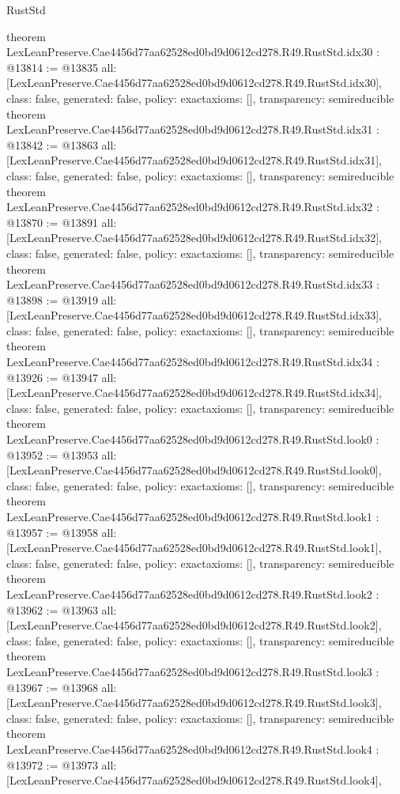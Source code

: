 \begin{lexlean}{RustStd}
\begin{coremodule}
{}
theorem LexLeanPreserve.Cae4456d77aa62528ed0bd9d0612cd278.R49.RustStd.idx30 : @13814 := @13835 {
  all: [LexLeanPreserve.Cae4456d77aa62528ed0bd9d0612cd278.R49.RustStd.idx30],
  class: false,
  generated: false,
  policy: exact{axioms: []},
  transparency: semireducible
}
theorem LexLeanPreserve.Cae4456d77aa62528ed0bd9d0612cd278.R49.RustStd.idx31 : @13842 := @13863 {
  all: [LexLeanPreserve.Cae4456d77aa62528ed0bd9d0612cd278.R49.RustStd.idx31],
  class: false,
  generated: false,
  policy: exact{axioms: []},
  transparency: semireducible
}
theorem LexLeanPreserve.Cae4456d77aa62528ed0bd9d0612cd278.R49.RustStd.idx32 : @13870 := @13891 {
  all: [LexLeanPreserve.Cae4456d77aa62528ed0bd9d0612cd278.R49.RustStd.idx32],
  class: false,
  generated: false,
  policy: exact{axioms: []},
  transparency: semireducible
}
theorem LexLeanPreserve.Cae4456d77aa62528ed0bd9d0612cd278.R49.RustStd.idx33 : @13898 := @13919 {
  all: [LexLeanPreserve.Cae4456d77aa62528ed0bd9d0612cd278.R49.RustStd.idx33],
  class: false,
  generated: false,
  policy: exact{axioms: []},
  transparency: semireducible
}
theorem LexLeanPreserve.Cae4456d77aa62528ed0bd9d0612cd278.R49.RustStd.idx34 : @13926 := @13947 {
  all: [LexLeanPreserve.Cae4456d77aa62528ed0bd9d0612cd278.R49.RustStd.idx34],
  class: false,
  generated: false,
  policy: exact{axioms: []},
  transparency: semireducible
}
theorem LexLeanPreserve.Cae4456d77aa62528ed0bd9d0612cd278.R49.RustStd.look0 : @13952 := @13953 {
  all: [LexLeanPreserve.Cae4456d77aa62528ed0bd9d0612cd278.R49.RustStd.look0],
  class: false,
  generated: false,
  policy: exact{axioms: []},
  transparency: semireducible
}
theorem LexLeanPreserve.Cae4456d77aa62528ed0bd9d0612cd278.R49.RustStd.look1 : @13957 := @13958 {
  all: [LexLeanPreserve.Cae4456d77aa62528ed0bd9d0612cd278.R49.RustStd.look1],
  class: false,
  generated: false,
  policy: exact{axioms: []},
  transparency: semireducible
}
theorem LexLeanPreserve.Cae4456d77aa62528ed0bd9d0612cd278.R49.RustStd.look2 : @13962 := @13963 {
  all: [LexLeanPreserve.Cae4456d77aa62528ed0bd9d0612cd278.R49.RustStd.look2],
  class: false,
  generated: false,
  policy: exact{axioms: []},
  transparency: semireducible
}
theorem LexLeanPreserve.Cae4456d77aa62528ed0bd9d0612cd278.R49.RustStd.look3 : @13967 := @13968 {
  all: [LexLeanPreserve.Cae4456d77aa62528ed0bd9d0612cd278.R49.RustStd.look3],
  class: false,
  generated: false,
  policy: exact{axioms: []},
  transparency: semireducible
}
theorem LexLeanPreserve.Cae4456d77aa62528ed0bd9d0612cd278.R49.RustStd.look4 : @13972 := @13973 {
  all: [LexLeanPreserve.Cae4456d77aa62528ed0bd9d0612cd278.R49.RustStd.look4],
}
\end{coremodule}
\end{lexlean}
